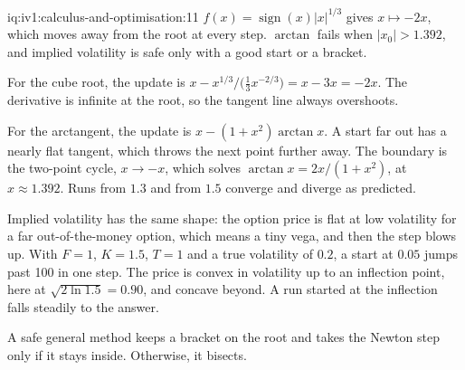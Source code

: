 \begin{solution}{iq:iv1:calculus-and-optimisation:11}
$f(x) = \operatorname{sign}(x)|x|^{1/3}$ gives $x \mapsto -2x$, which moves away from the root at every step. $\arctan$ fails when $|x_0| > 1.392$, and implied volatility is safe only with a good start or a bracket.

For the cube root, the update is $x - x^{1/3}/\bigl(\frac13 x^{-2/3}\bigr) = x - 3x = -2x$. The derivative is infinite at the root, so the tangent line always overshoots.

For the arctangent, the update is $x - (1 + x^2)\arctan x$. A start far out has a nearly flat tangent, which throws the next point further away. The boundary is the two-point cycle, $x \to -x$, which solves $\arctan x = 2x/(1 + x^2)$, at $x \approx 1.392$. Runs from $1.3$ and from $1.5$ converge and diverge as predicted.

Implied volatility has the same shape: the option price is flat at low volatility for a far out-of-the-money option, which means a tiny vega, and then the step blows up. With $F = 1$, $K = 1.5$, $T = 1$ and a true volatility of $0.2$, a start at $0.05$ jumps past 100 in one step. The price is convex in volatility up to an inflection point, here at $\sqrt{2\ln 1.5} = 0.90$, and concave beyond. A run started at the inflection falls steadily to the answer.

A safe general method keeps a bracket on the root and takes the Newton step only if it stays inside. Otherwise, it bisects.



\end{solution}

